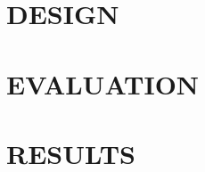 \documentclass[twocolumn,10pt]{asme2e}
\begin{document}
\section*{DESIGN}


\subsection*{}
\subsection*{} 
\subsection*{}
\subsection*{}


\section*{EVALUATION}

\subsection*{}

\subsection*{} 

\section*{RESULTS}

\subsection*{}

\subsection*{}

\subsection*{}
\end{document}
